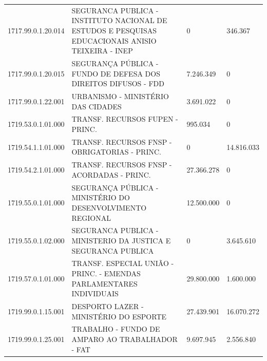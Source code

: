 \documentclass{article}
\begin{document}
\begin{longtable}[c]{m{2cm}|m{11cm}|m{2cm}m{2cm}}
\multicolumn{1}{C{2cm}|}{1717.99.0.1.20.014} & \multicolumn{1}{L{11cm}|}{SEGURANCA PUBLICA - INSTITUTO NACIONAL DE ESTUDOS E PESQUISAS EDUCACIONAIS ANISIO TEIXEIRA - INEP} & \multicolumn{1}{R{2cm}|}{            0} & \multicolumn{1}{R{2cm}}{346.367} \\
\multicolumn{1}{C{2cm}|}{1717.99.0.1.20.015} & \multicolumn{1}{L{11cm}|}{SEGURANÇA PÚBLICA - FUNDO DE DEFESA DOS DIREITOS DIFUSOS - FDD} & \multicolumn{1}{R{2cm}|}{7.246.349} & \multicolumn{1}{R{2cm}}{            0} \\
\multicolumn{1}{C{2cm}|}{1717.99.0.1.22.001} & \multicolumn{1}{L{11cm}|}{URBANISMO - MINISTÉRIO DAS CIDADES} & \multicolumn{1}{R{2cm}|}{3.691.022} & \multicolumn{1}{R{2cm}}{            0} \\
\multicolumn{1}{C{2cm}|}{1719.53.0.1.01.000} & \multicolumn{1}{L{11cm}|}{TRANSF. RECURSOS FUPEN - PRINC.} & \multicolumn{1}{R{2cm}|}{995.034} & \multicolumn{1}{R{2cm}}{            0} \\
\multicolumn{1}{C{2cm}|}{1719.54.1.1.01.000} & \multicolumn{1}{L{11cm}|}{TRANSF. RECURSOS FNSP - OBRIGATORIAS - PRINC.} & \multicolumn{1}{R{2cm}|}{            0} & \multicolumn{1}{R{2cm}}{14.816.033} \\
\multicolumn{1}{C{2cm}|}{1719.54.2.1.01.000} & \multicolumn{1}{L{11cm}|}{TRANSF. RECURSOS FNSP - ACORDADAS - PRINC.} & \multicolumn{1}{R{2cm}|}{27.366.278} & \multicolumn{1}{R{2cm}}{            0} \\
\multicolumn{1}{C{2cm}|}{1719.55.0.1.01.000} & \multicolumn{1}{L{11cm}|}{SEGURANÇA PÚBLICA - MINISTÉRIO DO DESENVOLVIMENTO REGIONAL} & \multicolumn{1}{R{2cm}|}{12.500.000} & \multicolumn{1}{R{2cm}}{            0} \\
\multicolumn{1}{C{2cm}|}{1719.55.0.1.02.000} & \multicolumn{1}{L{11cm}|}{SEGURANCA PUBLICA - MINISTERIO DA JUSTICA E SEGURANCA PUBLICA} & \multicolumn{1}{R{2cm}|}{            0} & \multicolumn{1}{R{2cm}}{3.645.610} \\
\multicolumn{1}{C{2cm}|}{1719.57.0.1.01.000} & \multicolumn{1}{L{11cm}|}{TRANSF. ESPECIAL UNIÃO - PRINC. - EMENDAS PARLAMENTARES INDIVIDUAIS} & \multicolumn{1}{R{2cm}|}{29.800.000} & \multicolumn{1}{R{2cm}}{1.600.000} \\
\multicolumn{1}{C{2cm}|}{1719.99.0.1.15.001} & \multicolumn{1}{L{11cm}|}{DESPORTO LAZER - MINISTÉRIO DO ESPORTE} & \multicolumn{1}{R{2cm}|}{27.439.901} & \multicolumn{1}{R{2cm}}{16.070.272} \\
\multicolumn{1}{C{2cm}|}{1719.99.0.1.25.001} & \multicolumn{1}{L{11cm}|}{TRABALHO - FUNDO DE AMPARO AO TRABALHADOR - FAT} & \multicolumn{1}{R{2cm}|}{9.697.945} & \multicolumn{1}{R{2cm}}{2.556.840} \\

\end{longtable}
\end{document}
